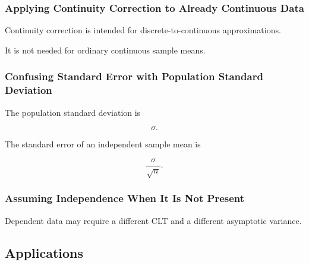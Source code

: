 \subsubsection{Applying Continuity Correction to Already Continuous Data}

Continuity correction is intended for discrete-to-continuous
approximations.

It is not needed for ordinary continuous sample means.

\subsubsection{Confusing Standard Error with Population Standard Deviation}

The population standard deviation is

\[
\sigma.
\]

The standard error of an independent sample mean is

\[
\boxed{
\frac{\sigma}{\sqrt{n}}.
}
\]

\subsubsection{Assuming Independence When It Is Not Present}

Dependent data may require a different CLT and a different asymptotic
variance.

\subsection{Applications}
\label{subsec:clt-applications}


